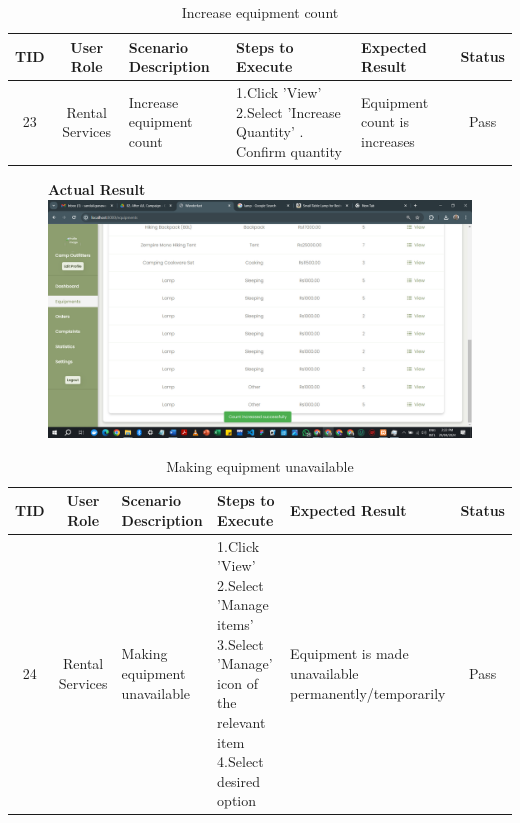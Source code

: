 \begin{table}[ht]
\centering
\begin{tabularx}{\textwidth}{|c|c|X|X|X|c|}
\hline
\textbf{TID} & \textbf{User Role} & \textbf{Scenario Description} & \textbf{Steps to Execute} & \textbf{Expected Result} & \textbf{Status} \\ \hline
23 & Rental Services & Increase equipment count & 1.Click 'View' \newline2.Select 'Increase Quantity' \newline3. Confirm quantity & Equipment count is increases & Pass \\ \hline
\end{tabularx}
\caption{Increase equipment count}
\end{table}

\begin{figure}[h!]
    \centering
    \textbf{Actual Result}
    \includegraphics[width=1\textwidth]{Images/Test Cases/23. Increasing equipment count.png}
\end{figure}
\clearpage


\begin{table}[ht]
\centering
\begin{tabularx}{\textwidth}{|c|c|X|X|X|c|}
\hline
\textbf{TID} & \textbf{User Role} & \textbf{Scenario Description} & \textbf{Steps to Execute} & \textbf{Expected Result} & \textbf{Status} \\ \hline
    24 & Rental Services & Making equipment unavailable & 1.Click 'View' \newline2.Select 'Manage items' \newline3.Select 'Manage' icon of the relevant item \newline4.Select desired option & Equipment is made unavailable permanently/temporarily & Pass \\ \hline
\end{tabularx}
\caption{Making equipment unavailable}
\end{table}


